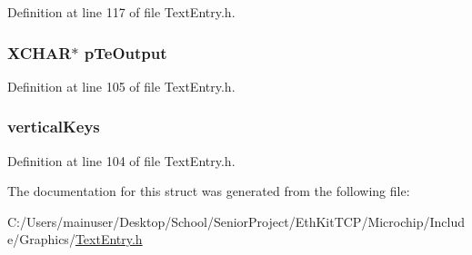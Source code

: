Definition at line 117 of file Text\+Entry.\+h.

\hypertarget{struct_t_e_x_t_e_n_t_r_y_a30f173ef1b786e180830681035d96353}{}
\subsubsection[{p\+Te\+Output}]{\setlength{\rightskip}{0pt plus 5cm}X\+C\+H\+A\+R$\ast$ p\+Te\+Output}\label{struct_t_e_x_t_e_n_t_r_y_a30f173ef1b786e180830681035d96353}


Definition at line 105 of file Text\+Entry.\+h.

\hypertarget{struct_t_e_x_t_e_n_t_r_y_a60ea442272615cc75a1a467ed2fd719e}{}
\subsubsection[{vertical\+Keys}]{ vertical\+Keys}\label{struct_t_e_x_t_e_n_t_r_y_a60ea442272615cc75a1a467ed2fd719e}


Definition at line 104 of file Text\+Entry.\+h.



The documentation for this struct was generated from the following file\+:\begin{DoxyCompactItemize}
\item 
C\+:/\+Users/mainuser/\+Desktop/\+School/\+Senior\+Project/\+Eth\+Kit\+T\+C\+P/\+Microchip/\+Include/\+Graphics/\hyperlink{_text_entry_8h}{Text\+Entry.\+h}\end{DoxyCompactItemize}
